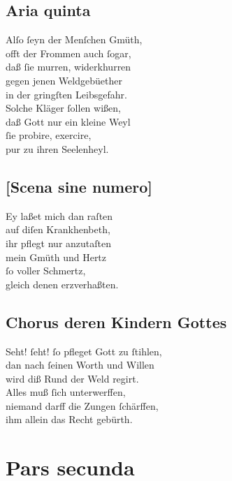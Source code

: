 \documentclass{ees}
\newenvironment{lyrics}[1]{%
  \subsection{#1}\nopagebreak%
  \begin{lyricslist}%
  \let\voice\item%
}{%
  \end{lyricslist}%
}
\begin{document}
\begin{lyrics}{Aria quinta}
  \voice[Eliphas]
  Alſo ſeyn der Menſchen Gmüth,\\
  offt der Frommen auch ſogar,\\
  daß ſie murren, widerkhurren\\
  gegen jenen Weldgebüether\\
  in der gringſten Leibsgefahr.\\[1ex]
  Solche Kläger ſollen wißen,\\
  daß Gott nur ein kleine Weyl\\
  ſie probire, exercire,\\
  pur zu ihren Seelenheyl.
\end{lyrics}

\begin{lyrics}{[Scena sine numero]}
  \voice[Job]
  Ey laßet mich dan raſten\\
  auf diſen Krankhenbeth,\\
  ihr pflegt nur anzutaſten\\
  mein Gmüth und Hertz\\
  ſo voller Schmertz,\\
  gleich denen erzverhaßten.
\end{lyrics}

\begin{lyrics}{Chorus deren Kindern Gottes}
  \voice[Die Kinder Gottes]\enlargethispage{2\baselineskip}
  Seht! ſeht! ſo pfleget Gott zu ſtihlen,\\
  dan nach ſeinen Worth und Willen\\
  wird diß Rund der Weld regirt.\\
  Alles muß ſich unterwerffen,\\
  niemand darff die Zungen ſchärffen,\\
  ihm allein das Recht gebürth.
\end{lyrics}

\section{Pars secunda}
\end{document}
